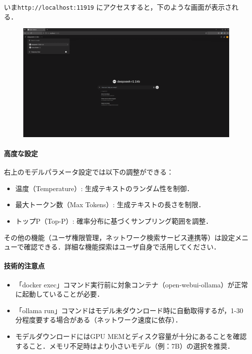 いま\texttt{http://localhost:11919} にアクセスすると，下のような画面が表示される．

\begin{figure}[H]
    \centering
    \includegraphics[width=0.8\linewidth]{images/Pasted image 20250304170628.png}
\end{figure}

\paragraph{高度な設定}
右上のモデルパラメータ設定では以下の調整ができる：
\begin{itemize}
\item 温度（Temperature）: 生成テキストのランダム性を制御．
\item 最大トークン数（Max Tokens）: 生成テキストの長さを制限．
\item トップP（Top-P）: 確率分布に基づくサンプリング範囲を調整．
\end{itemize}

その他の機能（ユーザ権限管理，ネットワーク検索サービス連携等）は設定メニューで確認できる．詳細な機能探索はユーザ自身で活用してください．

\paragraph{技術的注意点}
\begin{itemize}
\item 「docker exec」コマンド実行前に対象コンテナ（open-webui-ollama）が正常に起動していることが必要．
\item 「ollama run」コマンドはモデル未ダウンロード時に自動取得するが，1-30分程度要する場合がある（ネットワーク速度に依存）．
\item モデルダウンロードにはGPU MEMとディスク容量が十分にあることを確認すること．メモリ不足時はより小さいモデル（例：7B）の選択を推奨．
\end{itemize}